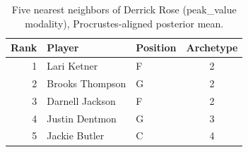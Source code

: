 \begin{table}[htbp]
  \centering\small
  \begin{tabular}{rllc}
    \toprule
    Rank & Player & Position & Archetype \\
    \midrule
    1 & Lari Ketner & F & 2 \\
    2 & Brooks Thompson & G & 2 \\
    3 & Darnell Jackson & F & 2 \\
    4 & Justin Dentmon & G & 3 \\
    5 & Jackie Butler & C & 4 \\
    \bottomrule
  \end{tabular}
  \caption{Five nearest neighbors of Derrick Rose (peak_value modality), Procrustes-aligned posterior mean.}
  \label{tab:Derrick_Rose_neighbors_peak_value}
\end{table}

